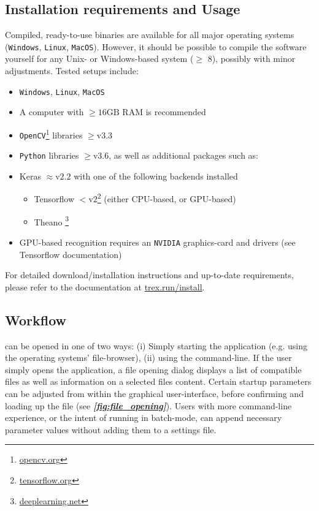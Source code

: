 \documentclass[9pt,lineno]{elife}
\newcommand{\figref}[1]{\textit{\textbf{\ref{#1}}}}
\newcommand{\TRex}{\protect\path{TRex}}
\begin{document}
\begin{appendixbox}
\section{Installation requirements and Usage}

Compiled, ready-to-use binaries are available for all major operating systems (\texttt{Windows}, \texttt{Linux}, \texttt{MacOS}). However, it should be possible to compile the software yourself for any Unix- or Windows-based system ($\ge$ 8), possibly with minor adjustments. Tested setups include:

\begin{itemize}
    \item \texttt{Windows}, \texttt{Linux}, \texttt{MacOS}
    \item A computer with $\geq 16\mathrm{GB}$ RAM is recommended
    \item \texttt{OpenCV}\footnote{\href{https://opencv.org}{opencv.org}} libraries $\ge \mathrm{v}3.3$
    \item \texttt{Python} libraries $\ge \mathrm{v}3.6$, as well as additional packages such as:
    \item Keras $\approx \mathrm{v}2.2$ with one of the following backends installed
    \begin{itemize}
        \item Tensorflow $<\mathrm{v}2$\footnote{\href{https://tensorflow.org}{tensorflow.org}} (either CPU-based, or GPU-based)
        \item Theano \footnote{\href{http://deeplearning.net/software/theano/}{deeplearning.net}}
    \end{itemize}
    \item GPU-based recognition requires an \texttt{NVIDIA} graphics-card and drivers (see Tensorflow documentation)
    
\end{itemize}

For detailed download/installation instructions and up-to-date requirements, please refer to the documentation at \href{https://trex.run/install}{trex.run/install}.

\subsection{Workflow}

\TRex{} can be opened in one of two ways: (i) Simply starting the application (e.g. using the operating systems' file-browser), (ii) using the command-line. If the user simply opens the application, a file opening dialog displays a list of compatible files as well as information on a selected files content. Certain startup parameters can be adjusted from within the graphical user-interface, before confirming and loading up the file (see \figref{fig:file_opening}). Users with more command-line experience, or the intent of running \TRex{} in batch-mode, can append necessary parameter values without adding them to a settings file.


\end{appendixbox}
\end{document}
